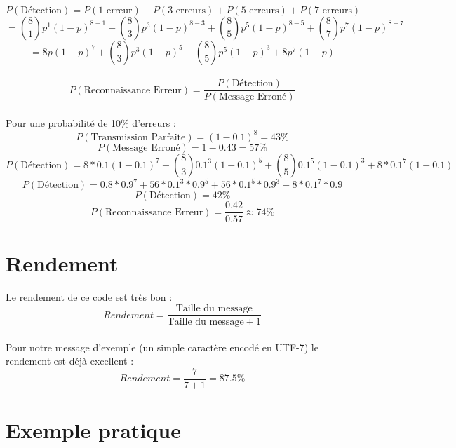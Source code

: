         \paragraph{}
\[  P(\text{Détection}) = P(\text{1 erreur}) + P(\text{3 erreurs}) + P(\text{5 erreurs}) + P(\text{7 erreurs}) \]
\[ = {8\choose 1}p^1(1-p)^{8-1} + {8\choose 3}p^3(1-p)^{8-3} + {8\choose 5}p^5(1-p)^{8-5} + {8\choose 7}p^7(1-p)^{8-7} \]
\[ = 8p(1-p)^7 + {8\choose 3}p^3(1-p)^5 + {8\choose 5}p^5(1-p)^3 + 8p^7(1-p) \]
        \paragraph{}
\[  P(\text{Reconnaissance Erreur}) = \frac{P(\text{Détection})}{P(\text{Message Erroné})}\]
        \paragraph{}
Pour une probabilité de 10\% d'erreurs :
\[  P(\text{Transmission Parfaite}) = (1-0.1)^{8} = 43\%\]
\[  P(\text{Message Erroné}) = 1 - 0.43 = 57\% \]
\[  P(\text{Détection}) = 8*0.1(1-0.1)^7 + {8\choose 3}0.1^3(1-0.1)^5 + {8\choose 5}0.1^5(1-0.1)^3 + 8*0.1^7(1-0.1) \]
\[  P(\text{Détection}) = 0.8*0.9^7 + 56*0.1^3*0.9^5 + 56*0.1^5*0.9^3 + 8*0.1^7*0.9 \]
\[  P(\text{Détection}) = 42\% \]
\[  P(\text{Reconnaissance Erreur}) = \frac{0.42}{0.57} \approx 74\% \]


    \section{Rendement}

        \paragraph{}
Le rendement de ce code est très bon :
\[  Rendement = \frac{\text{Taille du message}}{\text{Taille du message}+1} \]
        \paragraph{}
Pour notre message d'exemple (un simple caractère encodé en UTF-7) le rendement est déjà excellent :
\[  Rendement = \frac{7}{7+1} = 87.5\% \]


    \section{Exemple pratique}
           \lstset{
                language=bash, basicstyle=\ttfamily\small, columns=flexible,
                tabsize=2, extendedchars=true, showspaces=false,
                showstringspaces=false, numbers=left, numberstyle=\tiny,
                breaklines=true, breakautoindent=true, captionpos=b
            }


